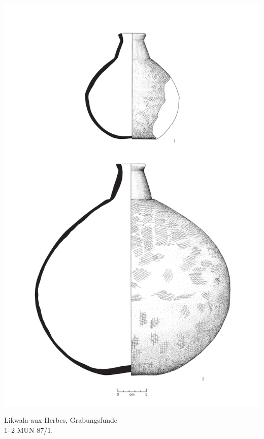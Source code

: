 \begin{pl}[H]
	\includegraphics{plt/Taf90.pdf}
	\vspace{.75em}\caption{Likwala-aux-Herbes, Grabungsfunde \\ 1--2 MUN 87/1.}
	\label{pl:90}
\end{pl}

